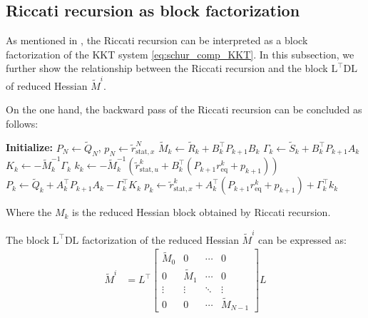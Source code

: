 \documentclass[conference]{IEEEtran}
\theoremstyle{plain}
\begin{document}
\subsection{Riccati recursion as block factorization}
As mentioned in \cite{frisonAlgorithmsMethodsHighPerformance}, 
the Riccati recursion can be interpreted as a block factorization of the KKT system \ref{eq:schur_comp_KKT}.
In this subsection, we further show the relationship between the Riccati recursion and the block $\mathrm{L}^\top \mathrm{DL}$ of reduced Hessian $\tilde{M}^i$.

On the one hand, the backward pass of the Riccati recursion can be concluded as follows:
\begin{algorithm}[H]
\caption{Backward Pass of Riccati Recursion}
\label{alg:riccati_recursion}
\begin{algorithmic}[1]
\State\textbf{Initialize:} $P_N \gets \tilde{Q}_N$, $p_N \gets \tilde{r}_{\mathrm{stat}, x}^N$
\Statex 
{}
    \State $\tilde{M}_k \gets \tilde{R}_k + B_k^\top P_{k+1} B_k$
    \State $\Gamma_k \gets \tilde{S}_k + B_k^\top P_{k+1} A_k$
    \State $K_k \gets -\tilde{M}_k^{-1} \Gamma_k$
    \State $k_k \gets -\tilde{M}_k^{-1} \left(\tilde{r}_{\mathrm{stat}, u}^k + B_k^\top (P_{k+1} r_{\mathrm{eq}}^k + p_{k+1})\right)$
    \State $P_k \gets \tilde{Q}_k + A_k^\top P_{k+1} A_k - \Gamma_k^\top K_k$
    \State $p_k \gets \tilde{r}_{\mathrm{stat}, x}^k + A_k^\top (P_{k+1} r_{\mathrm{eq}}^k + p_{k+1}) + \Gamma_k^\top k_k$
\EndFor
\end{algorithmic}
\end{algorithm}

Where the $M_k$ is the reduced Hessian block obtained by Riccati recursion. 

The block $\mathrm{L}^\top \mathrm{DL}$ factorization of the reduced Hessian $\tilde{M}^i$ can be expressed as:
\begin{align*}
    \tilde{M}^i &= L^\top 
    \begin{bmatrix}
    \tilde{M}_{0} & 0 & \cdots & 0 \\
    0 & \tilde{M}_{1} & \cdots & 0 \\
    \vdots & \vdots & \ddots & \vdots \\
    0 & 0 & \cdots & \tilde{M}_{N-1}
    \end{bmatrix}
    L
\end{align*}
\end{document}
